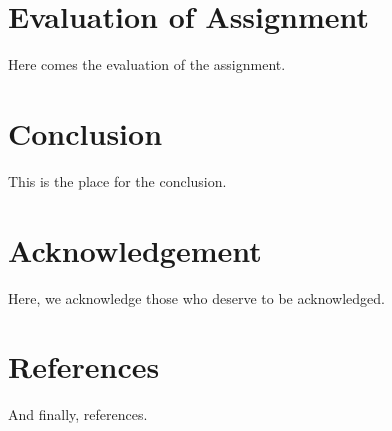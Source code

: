 \documentclass{article}
\begin{document}
\part{Evaluation of Assignment}

Here comes the evaluation of the assignment.

\part{Conclusion}

This is the place for the conclusion.

\part{Acknowledgement}

Here, we acknowledge those who deserve to be acknowledged.

\part{References}

And finally, references.
\end{document}
